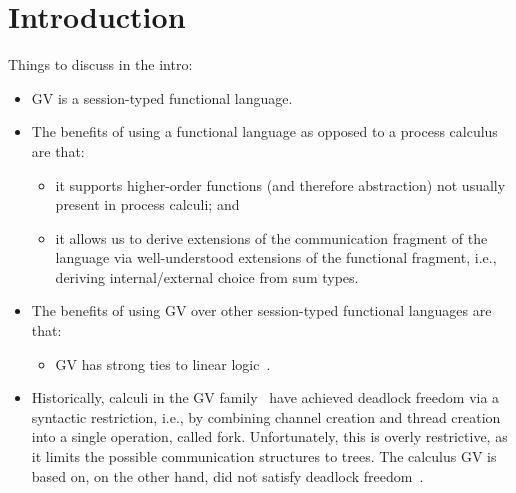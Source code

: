 \documentclass[main.tex]{subfiles}
\begin{document}
\section{Introduction}

Things to discuss in the intro:

\begin{itemize}
\item GV is a session-typed functional language.
\item
  The benefits of using a functional language as opposed to a process calculus are that:
  \begin{itemize}
  \item 
    it supports higher-order functions (and therefore abstraction) not usually present in process calculi; and
  \item
    it allows us to derive extensions of the communication fragment of the language via well-understood extensions of the functional fragment, i.e., deriving internal/external choice from sum types.
  \end{itemize}
\item
  The benefits of using GV over other session-typed functional languages are that:
  \begin{itemize}
  \item
    GV has strong ties to linear logic~\cite{wadler12}.
  \end{itemize}
\item
  Historically, calculi in the GV family~\cite{wadler12,lindleymorris15} have achieved deadlock freedom via a syntactic restriction, i.e., by combining channel creation and thread creation into a single operation, called fork. Unfortunately, this is overly restrictive, as it limits the possible communication structures to trees. The calculus GV is based on, on the other hand, did not satisfy deadlock freedom~\cite{gayvasconcelos10}.
\end{itemize}
\end{document}
